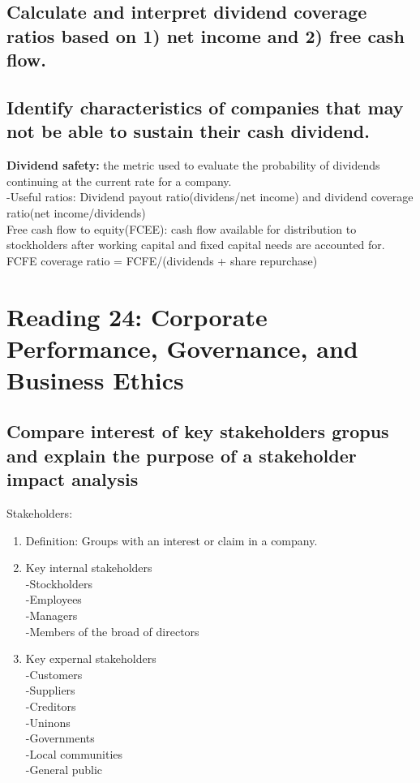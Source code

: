 \documentclass{article}
\newcommand{\be}{\begin{enumerate}}
\newcommand{\ee}{\end{enumerate}}
\begin{document}
\subsection{Calculate and interpret dividend coverage ratios based on 1) net income
and 2) free cash flow.}
\subsection{Identify characteristics of companies that may not be able to sustain
their cash dividend.}
{\bf Dividend safety:} the metric used to evaluate the probability of dividends
        continuing at the current rate for a company.
        \\-Useful ratios: Dividend payout ratio(dividens/net income) and 
        dividend coverage ratio(net income/dividends)
        \\Free cash flow to equity(FCEE): cash flow available for distribution
        to stockholders after working capital and fixed capital needs are accounted for.
        \\FCFE coverage ratio = FCFE/(dividends + share repurchase)


\section{Reading 24: Corporate Performance, Governance, and Business Ethics}
\subsection{Compare interest of key stakeholders gropus and explain the purpose of
a stakeholder impact analysis}
Stakeholders:
\be
    \item Definition: Groups with an interest or claim in a company.
    \item Key internal stakeholders
        \\-Stockholders
        \\-Employees
        \\-Managers
        \\-Members of the broad of directors
    \item Key expernal stakeholders
        \\-Customers
        \\-Suppliers
        \\-Creditors
        \\-Uninons
        \\-Governments
        \\-Local communities
        \\-General public
\ee
\end{document}
